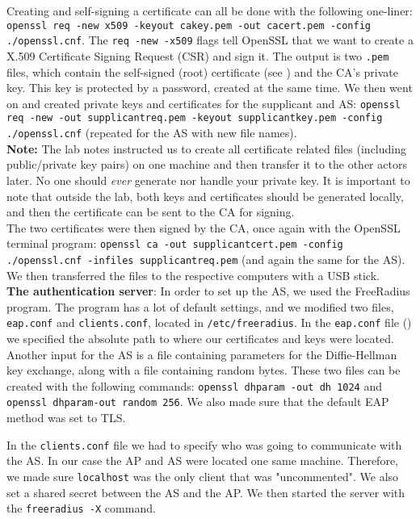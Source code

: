 \documentclass[a4paper,11pt]{article}
\begin{document}
Creating and self-signing a certificate can all be done with the following one-liner: \texttt{openssl req -new x509 -keyout cakey.pem -out cacert.pem -config ./openssl.cnf}. The \texttt{req -new -x509} flags tell OpenSSL that we want to create a X.509 Certificate Signing Request (CSR) and sign it. The output is two \texttt{.pem} files, which contain the self-signed (root) certificate (see ) and the CA's private key. This key is protected by a password, created at the same time. We then went on and created private keys and certificates for the supplicant and AS: \texttt{openssl req -new -out supplicantreq.pem -keyout supplicantkey.pem -config ./openssl.cnf} (repeated for the AS with new file names). \\

\noindent \textbf{Note:} The lab notes instructed us to create all certificate related files (including public/private key pairs) on one machine and then transfer it to the other actors later. No one should \emph{ever} generate nor handle your private key. It is important to note that outside the lab, both keys and certificates should be generated locally, and then the certificate can be sent to the CA for signing.\\

\noindent The two certificates were then signed by the CA, once again with the OpenSSL terminal program: \texttt{openssl ca -out supplicantcert.pem -config ./openssl.cnf -infiles supplicantreq.pem} (and again the same for the AS). We then transferred the files to the respective computers with a USB stick. \\

\noindent\textbf{The authentication server}: In order to set up the AS, we used the FreeRadius program. The program has a lot of default settings, and we modified two files, \texttt{eap.conf} and \texttt{clients.conf}, located in \texttt{/etc/freeradius}. In the \texttt{eap.conf} file () we specified the absolute path to where our certificates and keys were located. Another input for the AS is a file containing parameters for the Diffie-Hellman key exchange, along with a file containing random bytes. These two files can be created with the following commands: \texttt{openssl dhparam -out dh 1024} and \texttt{openssl dhparam-out random 256}. We also made sure that the default EAP method was set to TLS. 

In the \texttt{clients.conf} file we had to specify who was going to communicate with the AS. In our case the AP and AS were located one same machine. Therefore, we made sure \texttt{localhost} was the only client that was "uncommented". We also set a shared secret between the AS and the AP. We then started the server with the \texttt{freeradius -X} command. \\
\end{document}
